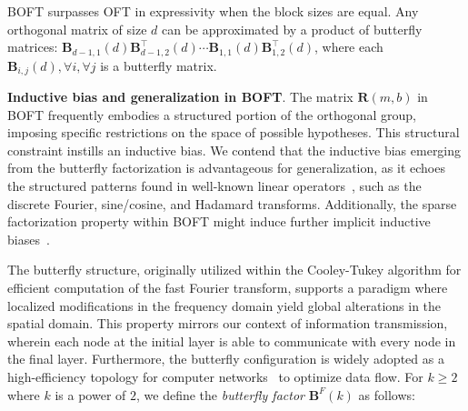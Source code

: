 \begin{theorem}\label{thm:exp_boft}
    BOFT surpasses OFT in expressivity when the block sizes are equal. Any orthogonal matrix of size $d$ can be approximated by a product of butterfly matrices: $\bm{B}_{d-1,1}(d)\bm{B}^\top_{d-1,2}(d)\cdots\bm{B}_{1,1}(d)\bm{B}^\top_{1,2}(d)$, where each $\bm{B}_{i,j}(d),\forall i,\forall j$ is a butterfly matrix.
\end{theorem}

\textbf{Inductive bias and generalization in BOFT}. The matrix $\bm{R}(m,b)$ in BOFT frequently embodies a structured portion of the orthogonal group, imposing specific restrictions on the space of possible hypotheses. This structural constraint instills an inductive bias. We contend that the inductive bias emerging from the butterfly factorization is advantageous for generalization, as it echoes the structured patterns found in well-known linear operators~\cite{dao2019kaleidoscope}, such as the discrete Fourier, sine/cosine, and Hadamard transforms. Additionally, the sparse factorization property within BOFT might induce further implicit inductive biases~\cite{gunasekar2017implicit,li2018algorithmic,liu2019neural}.

The butterfly structure, originally utilized within the Cooley-Tukey algorithm for efficient computation of the fast Fourier transform, supports a paradigm where localized modifications in the frequency domain yield global alterations in the spatial domain. This property mirrors our context of information transmission, wherein each node at the initial layer is able to communicate with every node in the final layer. Furthermore, the butterfly configuration is widely adopted as a high-efficiency topology for computer networks~\cite{solihin2015fundamentals,li2011linear} to optimize data flow. For $k\geq 2$ where $k$ is a power of $2$, we define the \emph{butterfly factor} $\bm{B}^F(k)$ as follows:


